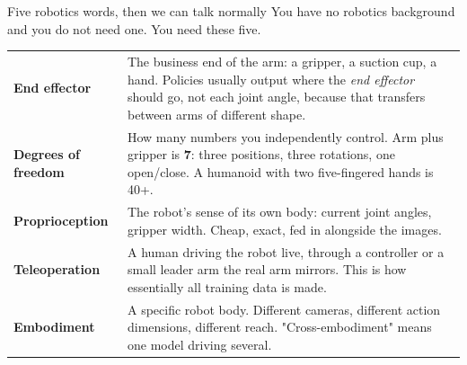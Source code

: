 \documentclass[aspectratio=169]{beamer}
\begin{document}
\begin{frame}{Five robotics words, then we can talk normally}
  \small
  You have no robotics background and you do not need one. You need these five.
  \vskip 6pt
  \begin{center}
    \footnotesize
    \begin{tabular}{p{3.0cm}p{8.6cm}}
      \toprule
      \textbf{End effector} & The business end of the arm: a gripper, a suction cup, a hand.
        Policies usually output where the \emph{end effector} should go, not each joint
        angle, because that transfers between arms of different shape. \\
      \textbf{Degrees of freedom} & How many numbers you independently control. Arm plus
        gripper is \textbf{7}: three positions, three rotations, one open/close. A humanoid
        with two five-fingered hands is 40+. \\
      \textbf{Proprioception} & The robot's sense of its own body: current joint angles,
        gripper width. Cheap, exact, fed in alongside the images. \\
      \textbf{Teleoperation} & A human driving the robot live, through a controller or a
        small leader arm the real arm mirrors. This is how essentially all training data is
        made. \\
      \textbf{Embodiment} & A specific robot body. Different cameras, different action
        dimensions, different reach. "Cross-embodiment" means one model driving several. \\
      \bottomrule
    \end{tabular}
  \end{center}
\end{frame}
\end{document}
